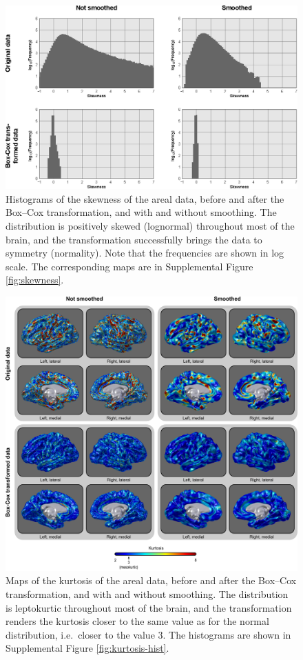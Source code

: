 \begin{figure}[!p]  %
\centering
\includegraphics[width=14cm]{images/skewness-hist.eps}
\caption[Histograms of the skewness of the areal data.]{Histograms of the skewness of the areal data, before and after the Box--Cox transformation, and with and without smoothing. The distribution is positively skewed (lognormal) throughout most of the brain, and the transformation successfully brings the data to symmetry (normality). Note that the frequencies are shown in log scale. The corresponding maps are in Supplemental Figure \ref{fig:skewness}.}
\label{fig:skewness-hist}
\end{figure}

\begin{figure}[!p]  %
\centering
\includegraphics[width=14cm]{images/kurtosis.png}
\caption[Maps of the kurtosis of the areal data.]{Maps of the kurtosis of the areal data, before and after the Box--Cox transformation, and with and without smoothing. The distribution is leptokurtic throughout most of the brain, and the transformation renders the kurtosis closer to the same value as for the normal distribution, i.e.\ closer to the value 3. The histograms are shown in Supplemental Figure \ref{fig:kurtosis-hist}.}
\label{fig:kurtosis}
\end{figure}

